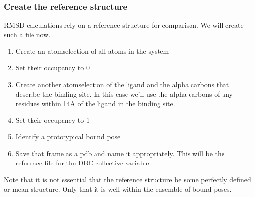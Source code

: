 \documentclass[9pt,tutorial]{Styling/livecoms}
\begin{document}
\subsubsection{Create the reference structure} 
\label{sec:referenceStructure}
RMSD calculations rely on a reference structure for comparison. We will create such a file now. 
\begin{enumerate}
    \item Create an atomselection of all atoms in the system
    \item Set their occupancy to 0
    \item Create another atomselection of the ligand and the alpha carbons that describe the binding site. In this case we'll use the alpha carbons of any residues within 14A of the ligand in the binding site.
    \item Set their occupancy to 1
    \item Identify a prototypical bound pose
    \item Save that frame as a pdb and name it appropriately. This will be the reference file for the DBC collective variable. 
\end{enumerate}
\begin{tcolorbox}[colback=blue!5!white,colframe=blue!75!black]
Note that it is not essential that the reference structure be some perfectly defined or mean structure. Only that it is well within the ensemble of bound poses. 
\end{tcolorbox}
\end{document}
